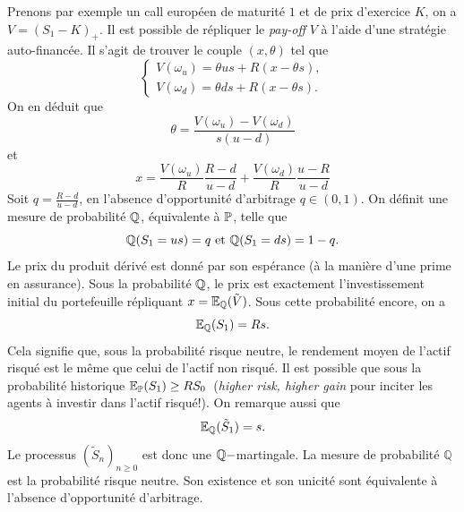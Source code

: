 Prenons par exemple un call européen de maturité $1$ et de prix d'exercice $K$, on a $V = (S_1-K)_+$. Il est possible de répliquer le \textit{pay-off} $V$ à l'aide d'une stratégie auto-financée. Il s'agit de trouver le couple $(x,\theta)$ tel que 
$$
\begin{cases}
V(\omega_u) = \theta u s+R(x-\theta s),\\
V(\omega_d) = \theta d s+R(x-\theta s).
\end{cases}
$$
On en déduit que 
$$
\theta = \frac{V(\omega_u)-V(\omega_d)}{s(u-d)}
$$
et 
\begin{equation}\label{eq:valeur_initiale}
x=\frac{V(\omega_u)}{R}\frac{R-d}{u-d} + \frac{V(\omega_d)}{R}\frac{u-R}{u-d}
\end{equation}
Soit $q =\frac{R-d}{u-d}$, en l'absence d'opportunité d'arbitrage $q\in(0,1)$. On définit une mesure de probabilité $\mathbb{Q}$, équivalente à $\mathbb{P}$, telle que 
$$
\mathbb{Q}(S_1 = us) = q\text{ et }\mathbb{Q}(S_1 = ds) = 1-q.
$$ 
Le prix du produit dérivé est donné par son espérance (à la manière d'une prime en assurance). Sous la probabilité $\mathbb{Q}$, le prix est exactement l'investissement initial du portefeuille répliquant $x = \mathbb{E}_{\mathbb{Q}}(\tilde V)$. Sous cette probabilité encore, on a 
$$
\mathbb{E}_{\mathbb{Q}}(S_1) = Rs.
$$
Cela signifie que, sous la probabilité risque neutre, le rendement moyen de l'actif risqué est le même que celui de l'actif non risqué. Il est possible que sous la probabilité historique $\mathbb{E}_{\mathbb{P}}(S_1) \geq RS_0$\ (\textit{higher risk, higher gain} pour inciter les agents à investir dans l'actif risqué!). 
On remarque aussi que
$$\mathbb{E}_{\mathbb{Q}}(\tilde{S}_1) = s.
$$ 
Le processus $(\tilde{S}_n)_{n\geq0}$ est donc une $\mathbb{Q}-$martingale. La mesure de probabilité $\mathbb{Q}$ est la probabilité risque neutre. Son existence et son unicité sont équivalente à l'absence d'opportunité d'arbitrage. 
